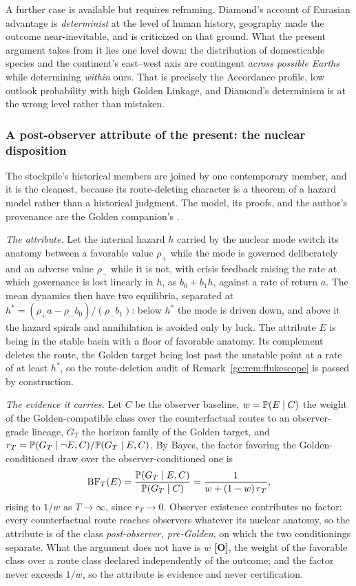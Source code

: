 A further case is available but requires reframing. Diamond's account of
Eurasian advantage \cite{Diamond97} is \emph{determinist} at the level
of human history, geography made the outcome near-inevitable, and
is criticized on that ground. What the present argument takes from it
lies one level down: the distribution of domesticable species and the
continent's east--west axis are contingent \emph{across possible
Earths} while determining \emph{within} ours. That is precisely the
Accordance profile, low outlook probability with high Golden Linkage,
and Diamond's determinism is at the wrong level rather than mistaken.

\subsubsection{A post-observer attribute of the present: the nuclear disposition}
\label{gc:subsub:nuclear}

The stockpile's historical members are joined by one contemporary member,
and it is the cleanest, because its route-deleting character is a theorem
of a hazard model rather than a historical judgment. The model, its
proofs, and the author's provenance are the Golden companion's
\cite{GoldenReasoning}.

\emph{The attribute.} Let the internal hazard $h$ carried by the nuclear
mode switch its anatomy between a favorable value $\rho_+$ while the mode
is governed deliberately and an adverse value $\rho_-$ while it is not,
with crisis feedback raising the rate at which governance is lost
linearly in $h$, as $b_0+b_1h$, against a rate of return $a$. The mean
dynamics then have two equilibria, separated at
$h^\ast=(\rho_+a-\rho_-b_0)/(\rho_-b_1)$: below $h^\ast$ the mode is driven
down, and above it the hazard spirals and annihilation is avoided only by
luck. The attribute $E$ is being in the stable basin with a floor of
favorable anatomy. Its complement deletes the route, the Golden target
being lost past the unstable point at a rate of at least $h^\ast$, so the
route-deletion audit of Remark~\ref{gc:rem:flukescope} is passed by
construction.

\emph{The evidence it carries.} Let $C$ be the observer baseline,
$w=\mathbb{P}(E\mid C)$ the weight of the Golden-compatible class over the
counterfactual routes to an observer-grade lineage, $G_T$ the horizon
family of the Golden target, and
$r_T=\mathbb{P}(G_T\mid\neg E,C)/\mathbb{P}(G_T\mid E,C)$. By Bayes, the factor
favoring the Golden-conditioned draw over the observer-conditioned one is
\[
\mathrm{BF}_T(E)=\frac{\mathbb{P}(G_T\mid E,C)}{\mathbb{P}(G_T\mid C)}=\frac{1}{w+(1-w)\,r_T},
\]
rising to $1/w$ as $T\to\infty$, since $r_T\to0$. Observer existence
contributes no factor: every counterfactual route reaches observers
whatever its nuclear anatomy, so the attribute is of the class
\emph{post-observer, pre-Golden}, on which the two conditionings
separate. What the argument does not have is $w$ \textbf{[O]}, the weight
of the favorable class over a route class declared independently of the
outcome; and the factor never exceeds $1/w$, so the attribute is evidence
and never certification.

